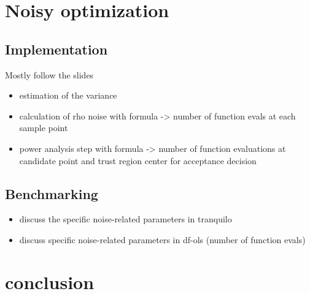 \section{Noisy optimization}

\subsection{Implementation}
\label{subsec:algo-impl-noisy}
Mostly follow the slides
\begin{itemize}
    \item estimation of the variance
    \item calculation of rho noise with formula -> number of function evals at each sample point
    \item power analysis step with formula -> number of function evaluations at candidate point and trust region center for acceptance decision
\end{itemize}
\subsection{Benchmarking}
\label{subsec:benchmarking-noisy}
\begin{itemize}
    \item discuss the specific noise-related parameters in tranquilo
    \item discuss specific noise-related parameters in df-ols (number of function evals)
\end{itemize}

\section{conclusion}
